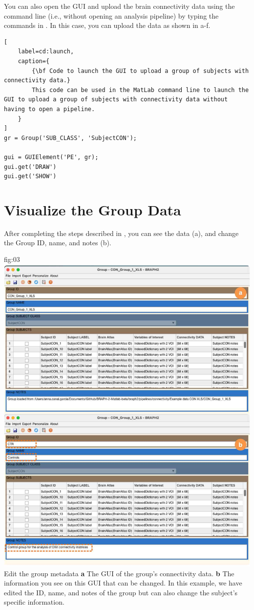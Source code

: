 \documentclass[justified]{tufte-handout}
\begin{document}
\begin{tcolorbox}[
	title=GUI launch from command line
]
You can also open the GUI and upload the brain connectivity data using the command line (i.e., without opening an analysis pipeline) by typing the commands in . In this case, you can upload the data as shown in a-f.
%
\begin{lstlisting}[
	label=cd:launch,
	caption={
		{\bf Code to launch the GUI to upload a group of subjects with connectivity data.}
		This code can be used in the MatLab command line to launch the GUI to upload a group of subjects with connectivity data without having to open a pipeline.
	}
]
gr = Group('SUB_CLASS', 'SubjectCON');

gui = GUIElement('PE', gr);
gui.get('DRAW')
gui.get('SHOW')
\end{lstlisting}
\end{tcolorbox}

\section{Visualize the Group Data}

After completing the steps described in , you can see the data (a), and change the Group ID, name, and notes (b). 

	{fig:03}
	{
	\includegraphics{fig03.jpg}
	}
	{Edit the group metadata}
	{ 
	{\bf a} The GUI of the group's connectivity data. 
	{\bf b} The information you see on this GUI that can be changed. In this example, we have edited the ID, name, and notes of the group but can also change the subject's specific information.
	}
\end{document}
